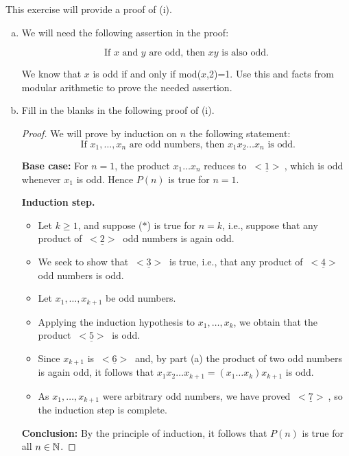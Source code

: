 \begin{exercise}{}
This exercise will provide a proof of (i).
\begin{enumerate}[(a)]
\item
We will need the following assertion in the proof:

\[ \text{If }x \text{ and } y \text{ are odd, then } xy \text{ is also odd.}\]

We know that $x$ is odd if and only if mod($x$,2)=1.  Use this and facts from modular arithmetic to prove the needed assertion.
\item
Fill in the blanks in the following proof of (i).

\begin{proof}
We will prove by induction on $n$ the following statement: 
\[
\tag{$P(n)$}
\text{ If $x_1,\dots,x_n$ are odd numbers, then 
$x_1x_2\dots x_n$ is odd.}
\]

\noindent
\textbf{Base case:} For $n=1$, the product $x_1\dots x_n$ reduces to 
$\underline{~<1>~}$, which  is odd whenever $x_1$ is odd. 
Hence $P(n)$ is true for $n=1$.

\noindent
\textbf{Induction step.}
\begin{itemize}
\item Let $k\ge 1$, and suppose ($*$) is true for $n=k$, i.e.,
suppose that any product of $\underline{~<2>~}$  odd numbers is again odd.
\item
We seek to show that $\underline{~<3>~}$ is true, i.e., that any product of $\underline{~<4>~}$
odd numbers is odd. 
\item
Let $x_1,\dots,x_{k+1}$ be odd numbers. 
\item
Applying the induction hypothesis to $x_1,\dots,x_k$, we obtain that the
product $\underline{~<5>~}$ is odd. 
\item
Since $x_{k+1}$ is $\underline{~<6>~}$  and, by part (a) the product of two odd numbers is
again odd, it follows that $x_1x_2\dots x_{k+1} = (x_1\dots x_k)x_{k+1}$
is odd.
\item
As $x_1,\dots,x_{k+1}$ were arbitrary odd numbers, we have proved
$\underline{~<7>~}$, so the induction step is complete.
\end{itemize}

\noindent
\textbf{Conclusion:} By the principle of induction, it follows that 
$P(n)$ is true for all $n\in\mathbb{N}$.
\end{proof}
\end{enumerate}
\end{exercise}

